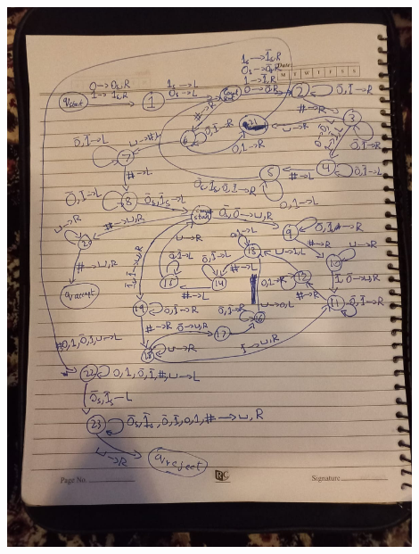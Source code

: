 \documentclass[addpoints]{exam}
\begin{document}
\begin{questions}
\begin{parts}
\begin{solution}
		\includegraphics[width=0.9\textwidth]{pic.jpeg}
	\end{solution}

	\end{parts}

	\newpage


\end{questions}
\end{document}
